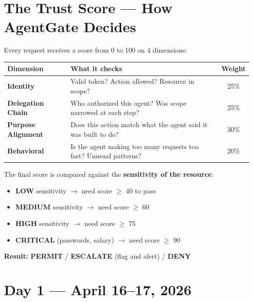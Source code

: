 \documentclass[12pt, a4paper]{article}
\begin{document}
\section{The Trust Score — How AgentGate Decides}

Every request receives a score from 0 to 100 on 4 dimensions:

\vspace{0.3cm}
\begin{tabularx}{\textwidth}{>{\bfseries}l X c}
  \toprule
  Dimension & What it checks & Weight \\
  \midrule
  Identity & Valid token? Action allowed? Resource in scope? & 25\% \\
  Delegation Chain & Who authorized this agent? Was scope narrowed at each step? & 25\% \\
  Purpose Alignment & Does this action match what the agent said it was built to do? & 30\% \\
  Behavioral & Is the agent making too many requests too fast? Unusual patterns? & 20\% \\
  \bottomrule
\end{tabularx}
\vspace{0.3cm}

The final score is compared against the \textbf{sensitivity of the resource}:

\begin{itemize}[noitemsep]
  \item \textbf{LOW} sensitivity $\rightarrow$ need score $\geq$ 40 to pass
  \item \textbf{MEDIUM} sensitivity $\rightarrow$ need score $\geq$ 60
  \item \textbf{HIGH} sensitivity $\rightarrow$ need score $\geq$ 75
  \item \textbf{CRITICAL} (passwords, salary) $\rightarrow$ need score $\geq$ 90
\end{itemize}

\textbf{Result:} \textcolor{permitgreen}{\textbf{PERMIT}} \quad/\quad
\textcolor{escalateyellow}{\textbf{ESCALATE}} (flag and alert) \quad/\quad
\textcolor{denyred}{\textbf{DENY}}

\section{Day 1 — April 16--17, 2026}
\end{document}
